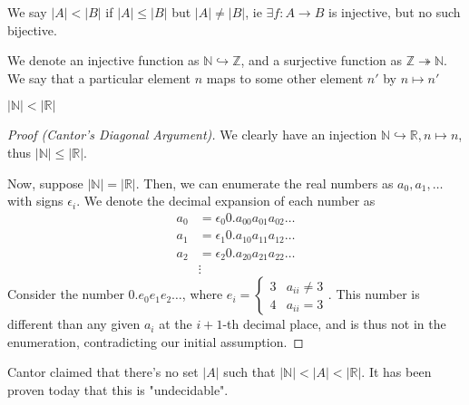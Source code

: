 \documentclass[12pt,oneside]{article}
\begin{document}
\begin{definition}
  We say $|A| < |B|$ if $|A| \leq |B|$ but $|A| \neq |B|$, ie $\exists f : A \to B$ is injective, but no such bijective.
\end{definition}

\begin{remark}
  We denote an injective function as $\mathbb{N} \hookrightarrow \mathbb{Z}$, and a surjective function as $\mathbb{Z} \twoheadrightarrow \mathbb{N}$. We say that a particular element $n$ maps to some other element $n'$ by $n \mapsto n'$
\end{remark}
\begin{theorem}[Cantor]
  $|\mathbb{N}|<|\mathbb{R}|$
\end{theorem}
\begin{proof}[Proof (Cantor's Diagonal Argument)]
  We clearly have an injection $\mathbb{N} \hookrightarrow \mathbb{R}, n \mapsto n$, thus $|\mathbb{N}|\leq|\mathbb{R}|$. 
  
  Now, suppose $|\mathbb{N}|=|\mathbb{R}|$. Then, we can enumerate the real numbers as $a_0, a_1, \dots$ with signs $\epsilon_i$. We denote the decimal expansion of each number as\footnotemark \begin{align*}
    a_0 &= \epsilon_0 0.a_{00}a_{01}a_{02}\dots\\
    a_1 &= \epsilon_1 0.a_{10}a_{11}a_{12}\dots\\
    a_2 &= \epsilon_2 0.a_{20}a_{21}a_{22}\dots\\
    &\vdots
  \end{align*} Consider the number $0.e_0e_1e_2\dots$, where $e_i = \begin{cases}
    3 & a_{ii} \neq 3\\
    4 & a_{ii} = 3
  \end{cases}.$ This number is different than any given $a_i$ at the $i+1$-th decimal place, and is thus not in the enumeration, contradicting our initial assumption.
\end{proof}

\begin{remark}
  Cantor claimed that there's no set $|A|$ such that $|\mathbb{N}| < |A| < |\mathbb{R}|$. It has been proven today that this is "undecidable".
\end{remark}
\end{document}
